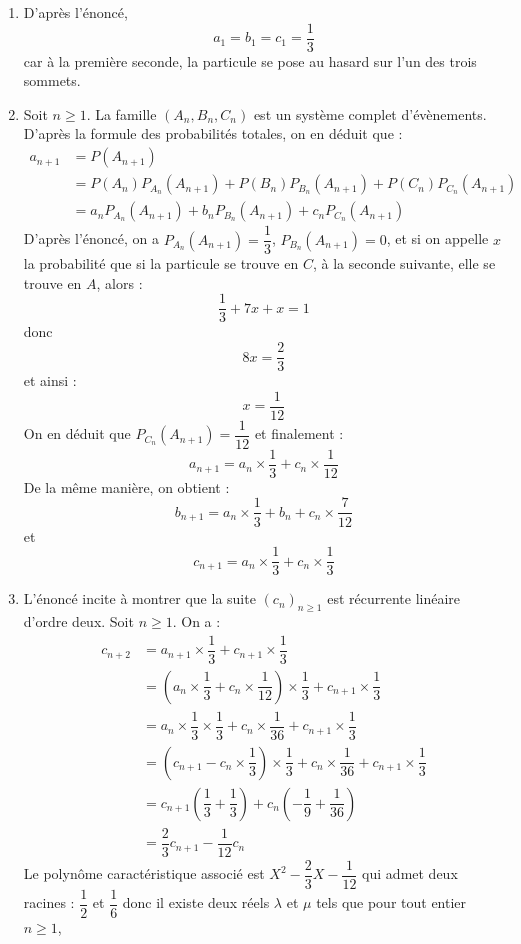 \documentclass[a4paper,10pt]{report}
\begin{document}
\newpage

\corr 

\begin{enumerate}
\item D'après l'énoncé,
$$ a_1= b_1=c_1 = \dfrac{1}{3}$$
car à la première seconde, la particule se pose au hasard sur l'un des trois sommets.
\item Soit $n \geq 1$. La famille $(A_n,B_n,C_n)$ est un système complet d'évènements. D'après la formule des probabilités totales, on en déduit que :
\begin{align*}
a_{n+1} & = P(A_{n+1}) \\
& = P(A_n) P_{A_n}(A_{n+1}) + P(B_n) P_{B_n}(A_{n+1}) + P(C_n) P_{C_n}(A_{n+1})  \\
& = a_n P_{A_n}(A_{n+1}) + b_n P_{B_n}(A_{n+1}) + c_n P_{C_n}(A_{n+1})  
\end{align*}
D'après l'énoncé, on a $P_{A_n}(A_{n+1})= \dfrac{1}{3}$, $P_{B_n}(A_{n+1}) = 0$, et si on appelle $x$ la probabilité que si la particule se trouve en $C$, à la seconde suivante, elle se trouve en $A$, alors :
$$ \dfrac{1}{3} + 7x + x = 1$$
donc 
$$ 8x = \dfrac{2}{3}$$
et ainsi :
$$ x = \dfrac{1}{12}$$
On en déduit que $P_{C_n}(A_{n+1}) = \dfrac{1}{12}$ et finalement :
$$ a_{n+1} = a_n \times \dfrac{1}{3}  + c_n \times \dfrac{1}{12}$$
De la même manière, on obtient :
$$ b_{n+1} = a_n \times \dfrac{1}{3} + b_n + c_n \times \dfrac{7}{12} $$
et 
$$ c_{n+1} = a_n \times \dfrac{1}{3} + c_n \times \dfrac{1}{3}$$
\item L'énoncé incite à montrer que la suite $(c_n)_{n \geq 1}$ est récurrente linéaire d'ordre deux. Soit $n \geq 1$. On a :
\begin{align*}
c_{n+2} & = a_{n+1} \times \dfrac{1}{3} + c_{n+1} \times \dfrac{1}{3} \\
& = \left(  a_n \times \dfrac{1}{3}  + c_n \times \dfrac{1}{12} \right) \times \dfrac{1}{3} + c_{n+1} \times \dfrac{1}{3} \\
& = a_n \times \dfrac{1}{3} \times \dfrac{1}{3}  + c_n \times \dfrac{1}{36}  + c_{n+1} \times \dfrac{1}{3} \\
& = \left( c_{n+1} - c_n \times \dfrac{1}{3} \right) \times \dfrac{1}{3}  + c_n \times \dfrac{1}{36}  + c_{n+1} \times \dfrac{1}{3} \\ 
& = c_{n+1} \left( \dfrac{1}{3} + \dfrac{1}{3} \right) + c_n \left(-\dfrac{1}{9} + \dfrac{1}{36} \right) \\
& = \dfrac{2}{3} c_{n+1} - \dfrac{1}{12} c_n
\end{align*}
Le polynôme caractéristique associé est $X^2 - \dfrac{2}{3} X - \dfrac{1}{12}$ qui admet deux racines : $\dfrac{1}{2}$ et $\dfrac{1}{6}$ donc il existe deux réels $\lambda$ et $\mu$ tels que pour tout entier $n \geq 1$,

\end{enumerate}
\end{document}
